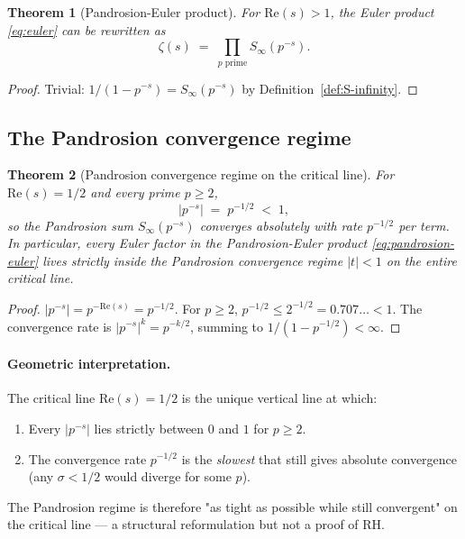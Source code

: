 \documentclass[11pt,a4paper]{article}
\newtheorem{theorem}{Theorem}[section]
\begin{document}
\begin{theorem}[Pandrosion-Euler product]\label{thm:pandrosion-euler}
For $\mathrm{Re}(s) > 1$, the Euler product \eqref{eq:euler} can be rewritten as
\begin{equation}\label{eq:pandrosion-euler}
\zeta(s) \;=\; \prod_{p \text{ prime}} S_\infty(p^{-s}).
\end{equation}
\end{theorem}

\begin{proof}
Trivial: $1/(1 - p^{-s}) = S_\infty(p^{-s})$ by Definition~\ref{def:S-infinity}.
\end{proof}

\subsection{The Pandrosion convergence regime}

\begin{theorem}[Pandrosion convergence regime on the critical line]\label{thm:regime}
For $\mathrm{Re}(s) = 1/2$ and every prime $p \ge 2$,
\begin{equation}\label{eq:regime}
|p^{-s}| \;=\; p^{-1/2} \;<\; 1,
\end{equation}
so the Pandrosion sum $S_\infty(p^{-s})$ converges absolutely with rate $p^{-1/2}$ per term. In particular, every Euler factor in the Pandrosion-Euler product \eqref{eq:pandrosion-euler} lives strictly inside the Pandrosion convergence regime $|t| < 1$ on the entire critical line.
\end{theorem}

\begin{proof}
$|p^{-s}| = p^{-\mathrm{Re}(s)} = p^{-1/2}$. For $p \ge 2$, $p^{-1/2} \le 2^{-1/2} = 0.707\dots < 1$. The convergence rate is $|p^{-s}|^k = p^{-k/2}$, summing to $1/(1 - p^{-1/2}) < \infty$.
\end{proof}

\paragraph{Geometric interpretation.}
The critical line $\mathrm{Re}(s) = 1/2$ is the unique vertical line at which:
\begin{enumerate}
\item Every $|p^{-s}|$ lies strictly between $0$ and $1$ for $p \ge 2$.
\item The convergence rate $p^{-1/2}$ is the \emph{slowest} that still gives absolute convergence (any $\sigma < 1/2$ would diverge for some $p$).
\end{enumerate}
The Pandrosion regime is therefore "as tight as possible while still convergent" on the critical line — a structural reformulation but not a proof of RH.
\end{document}
